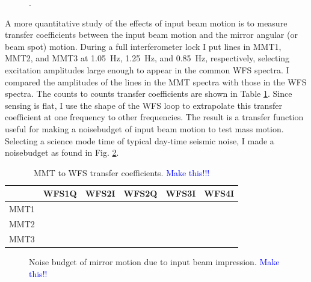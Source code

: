 \begin{figure}
\begin{centering}
\caption[]{.}
\label{fig:}
\end{centering}
\end{figure}

A more quantitative study of the effects of input beam motion is to
measure transfer coefficients between the input beam motion and the
mirror angular (or beam spot) motion. During a full interferometer
lock I put lines in MMT1, MMT2, and MMT3 at 1.05~Hz, 1.25~Hz, and
0.85~Hz, respectively, selecting excitation amplitudes large enough to
appear in the common WFS spectra. I compared the amplitudes of the
lines in the MMT spectra with those in the WFS spectra. The counts to
counts transfer coefficients are shown in Table
\ref{table:inputbeam_TFcoeffs}. Since sensing is flat, I use the shape
of the WFS loop to extrapolate this transfer coefficient at one
frequency to other frequencies. The result is a transfer function
useful for making a noisebudget of input beam motion to test mass
motion. Selecting a science mode time of typical day-time seismic
noise, I made a noisebudget as found in Fig. \ref{fig:inputbeam_NB}.


\begin{table}
\centering
\caption[MMT to WFS transfer coefficients]{MMT to WFS transfer
  coefficients. \textcolor{blue}{Make this!!!}}
\begin{tabular}{l l l l l l}
\hline
          & WFS1Q & WFS2I & WFS2Q & WFS3I & WFS4I \\
\hline
MMT1 & \\
MMT2 & \\
MMT3 & \\
\hline
\end{tabular}
\label{table:inputbeam_TFcoeffs}
\end{table}



\begin{figure}
\begin{centering}
  \caption[Mirror motion due to input beam impression]{Noise budget of
    mirror motion due to input beam impression. \textcolor{blue}{Make
      this!!}}
\label{fig:inputbeam_NB}
\end{centering}
\end{figure}


